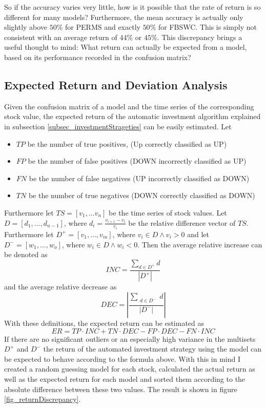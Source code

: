So if the accuracy varies very little, how is it possible that the rate of return is so different for many models? Furthermore, the mean accuracy is actually only slightly above $50\%$ for PERMS and exactly $50\%$ for FBSWC. This is simply not consistent with an average return of $44\%$ or $45\%$. This discrepancy brings a useful thought to mind: What return can actually be expected from a model, based on its performance recorded in the confusion matrix? \\

\subsection{Expected Return and Deviation Analysis}
Given the confusion matrix of a model and the time series of the corresponding stock value, the expected return of the automatic investment algorithm explained in subsection \ref{subsec_investmentStrageties} can be easily estimated. Let
\begin{itemize}
	\item $TP$ be the number of true positives, (Up correctly classified as UP)
	\item $FP$ be the number of false positives (DOWN incorrectly classified as UP)
	\item $FN$ be the number of false negatives (UP incorrectly classified as DOWN)
	\item $TN$ be the number of true negatives (DOWN correctly classified as DOWN)
\end{itemize}
Furthermore let $TS = [v_1,...v_n]$ be the time series of stock values. Let $D = [d_1,...,d_{n-1}]$, where $d_i = \frac{v_{i+1} - v_i}{v_i}$ be the relative difference vector of $TS$. Furthermore let $D^+ = [v_1,...,v_m]$, where $v_i \in D \land v_i > 0$ and let $D^- = [w_1,...,w_o]$, where $w_i \in D \land w_i < 0$.  Then the average relative increase can be denoted as \[INC  = \frac{\sum_{d \in D^+} d}{|D^+|} \] and the average relative decrease as \[ DEC = |\frac{\sum_{\substack{d \in D^-}} d}{|D^-|}| \]
With these definitions, the expected return can be estimated as \[ER  = TP \cdot INC + TN \cdot DEC - FP \cdot DEC - FN \cdot INC \]
If there are no significant outliers or an especially high variance in the multisets $D^+$ and $D^-$ the return of the automated investment strategy using the model can be expected to behave according to the formula above. With this in mind I created a random guessing model for each stock, calculated the actual return as well as the expected return for each model and sorted them according to the absolute difference between these two values. The result is shown in figure \ref{fig_returnDiscrepancy}.

